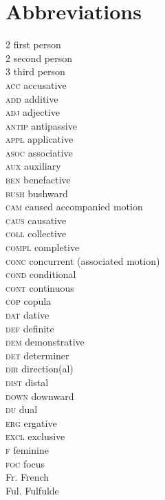 \chapter*{Abbreviations}

\begin{multicols}{2}
\singlespacing
\normalfont
{} first person \\
2 second person \\
3 third person \\
\textsc{acc} accusative \\
\textsc{add} additive \\
\textsc{adj} adjective \\
\textsc{antip} antipassive \\
\textsc{appl} applicative \\ 
\textsc{asoc} associative \\ 
\textsc{aux} auxiliary \\ 
\textsc{ben} benefactive \\ 
\textsc{bush} bushward \\ 
\textsc{cam} caused accompanied motion \\ 
\textsc{caus} causative \\ 
\textsc{coll} collective \\ 
\textsc{compl} completive \\ 
\textsc{conc} concurrent (associated motion) \\ 
\textsc{cond} conditional \\ 
\textsc{cont} continuous \\ 
\textsc{cop} copula \\ 
\textsc{dat} dative \\ 
\textsc{def} definite \\ 
\textsc{dem} demonstrative \\ 
\textsc{det} determiner \\ 
\textsc{dir} direction(al) \\ 
\textsc{dist} distal \\ 
\textsc{down} downward \\ 
\textsc{du} dual \\ 
\textsc{erg} ergative \\ 
\textsc{excl} exclusive \\ 
\textsc{f} feminine \\ 
\textsc{foc} focus \\ 
Fr. French \\ 
Ful. Fulfulde \\ 

\end{multicols}
